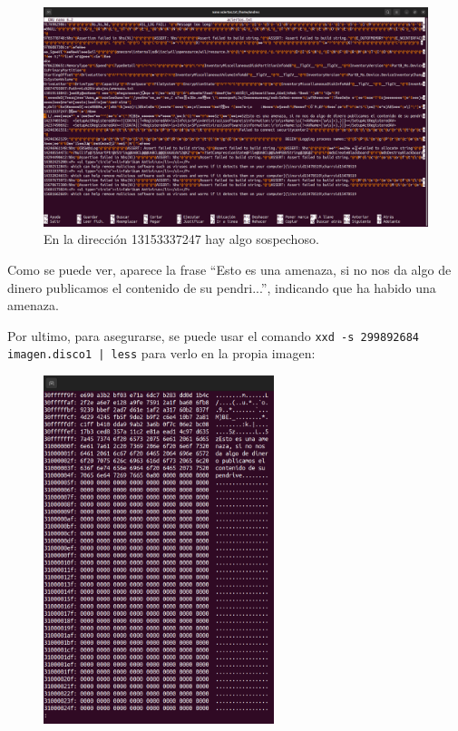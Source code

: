 \documentclass{article}
\begin{document}
\begin{figure}[H]
    \centering
    \includegraphics[width=\textwidth]{imagenes/Captura desde 2022-12-03 21-38-57.png}
    \caption{En la dirección 13153337247 hay algo sospechoso.}
\end{figure}
Como se puede ver, aparece la frase ``Esto es una amenaza, si no nos da algo de dinero publicamos el contenido de su pendri...'', indicando que ha habido una amenaza.

Por ultimo, para asegurarse, se puede usar el comando \texttt{xxd -s 299892684 imagen.disco1 | less} para verlo en la propia imagen:

\begin{figure}[H]
    \centering
    \includegraphics[width=0.6\textwidth]{imagenes/Captura desde 2022-12-03 21-39-24.png}
\end{figure}
\end{document}
